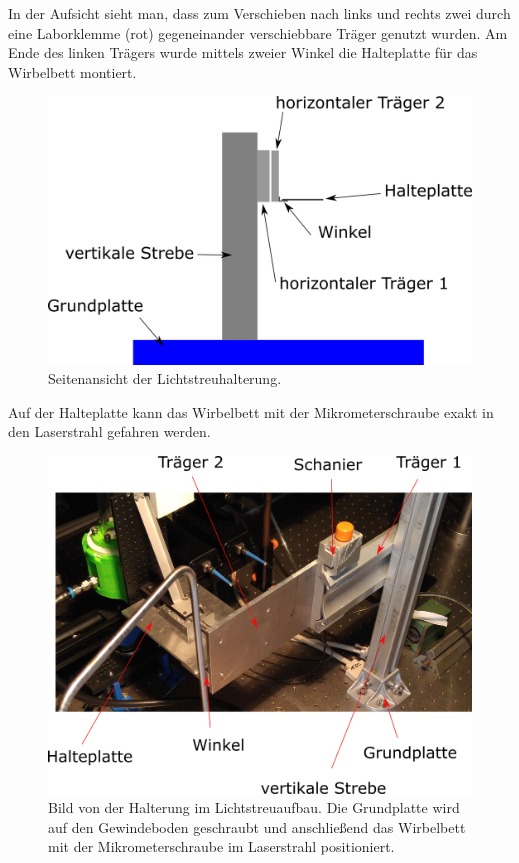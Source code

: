 In der Aufsicht sieht man, dass zum Verschieben nach links und rechts zwei durch eine Laborklemme (rot) gegeneinander verschiebbare Träger genutzt wurden. Am Ende des linken Trägers wurde mittels zweier Winkel die Halteplatte für das Wirbelbett montiert.

\newpage

\begin{figure}[h!]
		\centering
		\includegraphics[scale=0.7]{Halterung_Lichtstreu_Seite.png}
		\caption[Haltearm Lichtstreuaufbau Seitenansicht]{Seitenansicht der Lichtstreuhalterung.}
\end{figure}

 Auf der Halteplatte kann das Wirbelbett mit der Mikrometerschraube exakt in den Laserstrahl gefahren werden.

\begin{figure}[h!]
	\centering
	\includegraphics[scale=0.7]{Lichtstreuaufbau.png}
	\caption[Aufbau in Lichtstreuaufbau]{Bild von der Halterung im Lichtstreuaufbau. Die Grundplatte wird auf den Gewindeboden geschraubt und anschließend das Wirbelbett mit der Mikrometerschraube im Laserstrahl positioniert.}
\end{figure}

